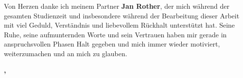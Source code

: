 Von Herzen danke ich meinem Partner \textbf{Jan Rother}, der mich während der gesamten Studienzeit und insbesondere während der Bearbeitung dieser Arbeit mit viel Geduld, Verständnis und liebevollem Rückhalt unterstützt hat. Seine Ruhe, seine aufmunternden Worte und sein Vertrauen haben mir gerade in anspruchsvollen Phasen Halt gegeben und mich immer wieder motiviert, weiterzumachen und an mich zu glauben.

\normalfont

\vspace{1em}
\begin{flushright}
    \textbf{\studentAName,\xspace \documentMonthOfYear \xspace \documentYear}
\end{flushright}
